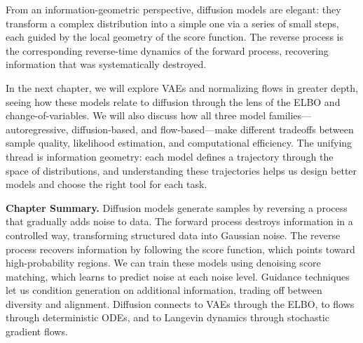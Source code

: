 \vspPara

From an information-geometric perspective, diffusion models are elegant: they transform a complex distribution into a simple one via a series of small steps, each guided by the local geometry of the score function. The reverse process is the corresponding reverse-time dynamics of the forward process, recovering information that was systematically destroyed.

\vspPara

In the next chapter, we will explore VAEs and normalizing flows in greater depth, seeing how these models relate to diffusion through the lens of the ELBO and change-of-variables. We will also discuss how all three model families---autoregressive, diffusion-based, and flow-based---make different tradeoffs between sample quality, likelihood estimation, and computational efficiency. The unifying thread is information geometry: each model defines a trajectory through the space of distributions, and understanding these trajectories helps us design better models and choose the right tool for each task.

\vspBlock

\begin{pausebox}
\textbf{Chapter Summary.} Diffusion models generate samples by reversing a process that gradually adds noise to data. The forward process destroys information in a controlled way, transforming structured data into Gaussian noise. The reverse process recovers information by following the score function, which points toward high-probability regions. We can train these models using denoising score matching, which learns to predict noise at each noise level. Guidance techniques let us condition generation on additional information, trading off between diversity and alignment. Diffusion connects to VAEs through the ELBO, to flows through deterministic ODEs, and to Langevin dynamics through stochastic gradient flows.
\end{pausebox}

\vspSection


